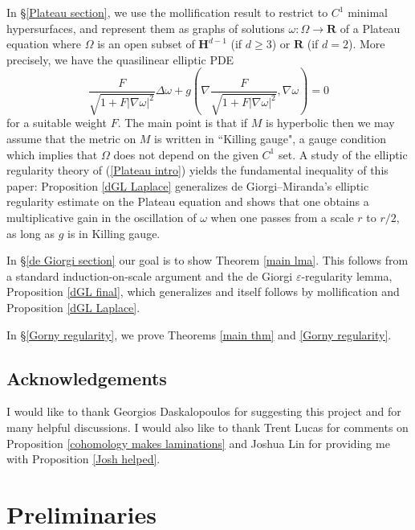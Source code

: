 \documentclass[reqno,10pt]{amsart}
\newcommand{\RR}{\mathbf{R}}
\newcommand{\Hyp}{\mathbf H}
\theoremstyle{definition}
\numberwithin{equation}{section}
\begin{document}
In \S\ref{Plateau section}, we use the mollification result to restrict to $C^1$ minimal hypersurfaces, and represent them as graphs of solutions $\omega: \Omega \to \RR$ of a Plateau equation where $\Omega$ is an open subset of $\Hyp^{d - 1}$ (if $d \geq 3$) or $\RR$ (if $d = 2$). More precisely, we have the quasilinear elliptic PDE
\begin{equation}\label{Plateau intro}
\frac{F}{\sqrt{1 + F|\nabla \omega|^2}} \Delta \omega + g\left(\nabla \frac{F}{\sqrt{1 + F|\nabla \omega|^2}}, \nabla \omega\right) = 0
\end{equation}
for a suitable weight $F$. The main point is that if $M$ is hyperbolic then we may assume that the metric on $M$ is written in ``Killing gauge", a gauge condition which implies that $\Omega$ does not depend on the given $C^1$ set.
A study of the elliptic regularity theory of (\ref{Plateau intro}) yields the fundamental inequality of this paper: Proposition \ref{dGL Laplace} generalizes de Giorgi--Miranda's elliptic regularity estimate on the Plateau equation \cite[Teorema 4.3]{Miranda66} and shows that one obtains a multiplicative gain in the oscillation of $\omega$ when one passes from a scale $r$ to $r/2$, as long as $g$ is in Killing gauge.

In \S\ref{de Giorgi section} our goal is to show Theorem \ref{main lma}.
This follows from a standard induction-on-scale argument and the de Giorgi $\varepsilon$-regularity lemma, Proposition \ref{dGL final}, which generalizes \cite[Teorema 5.7]{Miranda66} and itself follows by mollification and Proposition \ref{dGL Laplace}.

In \S\ref{Gorny regularity}, we prove Theorems \ref{main thm} and \ref{Gorny regularity}.



\subsection{Acknowledgements}
I would like to thank Georgios Daskalopoulos for suggesting this project and for many helpful discussions.
I would also like to thank Trent Lucas for comments on Proposition \ref{cohomology makes laminations} and Joshua Lin for providing me with Proposition \ref{Josh helped}.



\section{Preliminaries}\label{prelims}
\end{document}
